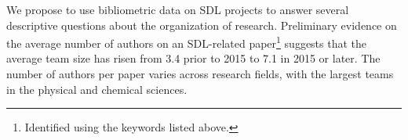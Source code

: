 \documentclass{article}
\begin{document}




We propose to use bibliometric data on SDL projects to answer several descriptive questions about the organization of research. Preliminary evidence on the average number of authors on an SDL-related paper\footnote{Identified using the keywords listed above.} suggests that the average team size has risen from 3.4 prior to 2015 to 7.1 in 2015 or later.  The number of authors per paper varies across research fields, with the largest teams in the physical and chemical sciences.
\end{document}
